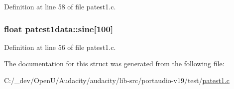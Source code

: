Definition at line 58 of file patest1.\+c.

\subsubsection[{\texorpdfstring{sine}{sine}}]{\setlength{\rightskip}{0pt plus 5cm}float patest1data\+::sine\mbox{[}100\mbox{]}}\hypertarget{structpatest1data_ad60ff32735775a159a8958032e9e3cab}{}\label{structpatest1data_ad60ff32735775a159a8958032e9e3cab}


Definition at line 56 of file patest1.\+c.



The documentation for this struct was generated from the following file\+:\begin{DoxyCompactItemize}
\item 
C\+:/\+\_\+dev/\+Open\+U/\+Audacity/audacity/lib-\/src/portaudio-\/v19/test/\hyperlink{patest1_8c}{patest1.\+c}\end{DoxyCompactItemize}
